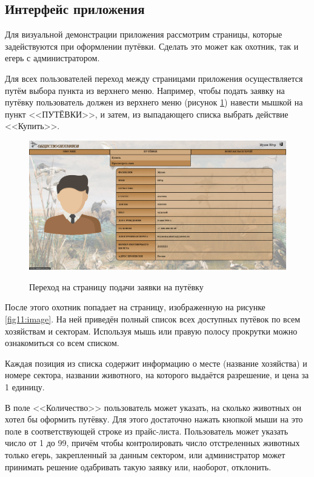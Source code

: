 	\subsection{Интерфейс приложения}
	Для визуальной демонстрации приложения рассмотрим страницы, которые задействуются при оформлении путёвки. Сделать это может как охотник, так и егерь с администратором. 
	
	
	Для всех пользователей переход между страницами приложения осуществляется путём выбора пункта из верхнего меню. Например, чтобы подать заявку на путёвку пользователь должен из верхнего меню (рисунок \ref{fig10:image}) навести мышкой на пункт <<ПУТЁВКИ>>, и затем, из выпадающего списка выбрать действие <<Купить>>.
	
	\begin{figure}[h]
		\centering
		\begin{center}
			{\includegraphics[scale=0.34]{schemes/screens/start.png}}
			\caption{Переход на страницу подачи заявки на путёвку}
			\label{fig10:image}
		\end{center}
	\end{figure}

	После этого охотник попадает на страницу, изображенную на рисунке \ref{fig11:image}. На ней приведён полный список всех доступных путёвок по всем хозяйствам и секторам. Используя мышь или правую полосу прокрутки можно ознакомиться со всем списком. 
	
	Каждая позиция из списка содержит информацию о месте (название хозяйства) и номере сектора, названии животного, на которого выдаётся разрешение, и цена за 1 единицу. 
	
	В поле <<Количество>> пользователь может указать, на сколько животных он хотел бы оформить путёвку. Для этого достаточно нажать кнопкой мыши на это поле в соответствующей строке из прайс-листа. Пользователь может указать число от 1 до 99, причём чтобы контролировать число отстреленных животных только егерь, закрепленный за данным сектором, или администратор может принимать решение одабривать такую заявку или, наоборот, отклонить. 
	
